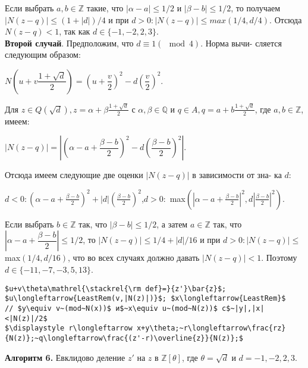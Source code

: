 \documentclass{mai_book}
\begin{document}
\pagebreak
%
%
\noindent
Если выбрать $a,b\in\mathbb{Z}$ такие, что $|\alpha-a|\leqslant{1/2}$ и $|\beta-b|\leqslant{1/2}$, то\linebreak
получаем $|N(z-q)|\leqslant(1+|d|)/4$ и при $d>0: |N(z-q)|\leqslant{max(1/4,d/4)}$.\linebreak
Отсюда $N(z-q)<1$, так как $d\in\{-1,-2,2,3\}$.\\
\hspace*{15pt}\textbf{Второй случай}. Предположим, что $d\equiv{1} (\mod{4})$. Норма вычи-\linebreak
сляется следующим образом:
\begin{center}
$N\left(u+v\dfrac{1+\sqrt{d}}{2}\right)=\left(u+\dfrac{v}{2}\right)^2-d\left(\dfrac{v}{2}\right)^2$.
\end{center}
Для $z\in{Q}(\sqrt{d}), z=\alpha+\beta\frac{1+\sqrt{d}}{2}$ с $\alpha,\beta\in\mathbb{Q}$ и $q\in{A}, q=a+b\frac{1+\sqrt{d}}{2}$, где\linebreak
$a,b\in\mathbb{Z}$, имеем:
\begin{center}
$|N(z-q)|=\left|\left(\alpha-a+\dfrac{\beta-b}{2}\right)^2-d\left(\dfrac{\beta-b}{2}\right)^2\right|$.
\end{center}
Отсюда имеем следующие две оценки $|N(z-q)|$ в зависимости от зна-\linebreak
ка $d$:
\begin{center}
\hspace*{43pt}$d<0 :$\hspace{20pt}$\left(\alpha-a+\frac{\beta-b}{2}\right)^2+|d|\left(\frac{\beta-b}{2}\right)^2$,\hspace{20pt}$d>0 :$\newline
max$\left(\left|\alpha-a+\frac{\beta-b}{2}\right|^2, d\left|\frac{\beta-b}{2}\right|^2\right)$.
\end{center}
Если выбрать $b\in\mathbb{Z}$ так, что $|\beta-b|\leqslant{1/2}$, а затем $a\in\mathbb{Z}$ так, что\linebreak
$\left|\alpha-a+\dfrac{\beta-b}{2}\right|\leqslant{1/2}$, то $|N(z-q)|\leqslant{1/4}+|d|/16$ и при $d>0: |N(z-q)|\leqslant$\linebreak
max$(1/4, d/16)$, что во всех случаях должно давать $|N(z-q)|<1$.\linebreak
Поэтому $d\in\{-11,-7,-3,5,13\}$.\newline
\begin{center}
\begin{lstlisting}[mathescape=true]
$u+v\theta\mathrel{\stackrel{\rm def}=}{z'}\bar{z}$;
$u\longleftarrow{LeastRem(v,|N(z)|)}$; $x\longleftarrow{LeastRem}$
// $y\equiv v~(mod~N(x))$ и$~x\equiv u~(mod~N(z))$ с$~|y|,|x|<|N(z)|/2$
$\displaystyle r\longleftarrow x+y\theta;~r\longleftarrow\frac{rz}{N(z)};~q\longleftarrow\frac{(z'-r)\overline{z}}{N(z)};$
\end{lstlisting}
\textbf{Алгоритм 6.} Евклидово деление $z'$ на $z$ в $\mathbb{Z}[\theta]$,\newline
где $\theta=\sqrt{d}$ и $d=-1, -2, 2, 3$.
\end{center}
\end{document}
